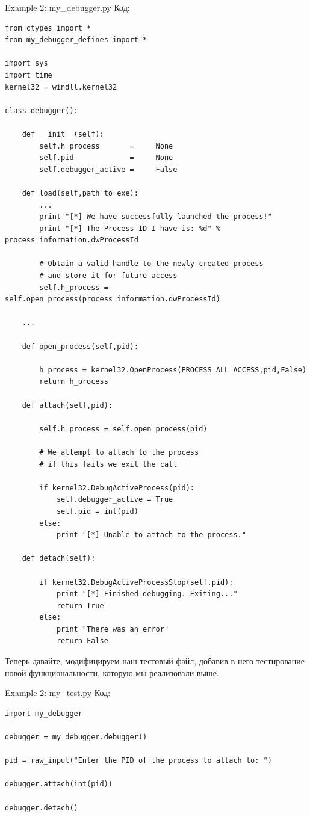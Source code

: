 \documentclass[12pt]{book}
\begin{document}
Example 2: my\_debugger.py
Код:
\begin{lstlisting}
from ctypes import *
from my_debugger_defines import *

import sys
import time
kernel32 = windll.kernel32

class debugger():

    def __init__(self):
        self.h_process       =     None
        self.pid             =     None
        self.debugger_active =     False
                                
    def load(self,path_to_exe):
        ...
        print "[*] We have successfully launched the process!"
        print "[*] The Process ID I have is: %d" % process_information.dwProcessId
        
        # Obtain a valid handle to the newly created process
        # and store it for future access
        self.h_process = self.open_process(process_information.dwProcessId)

    ...

    def open_process(self,pid):

        h_process = kernel32.OpenProcess(PROCESS_ALL_ACCESS,pid,False)
        return h_process

    def attach(self,pid):

        self.h_process = self.open_process(pid)

        # We attempt to attach to the process
        # if this fails we exit the call

        if kernel32.DebugActiveProcess(pid):
            self.debugger_active = True
            self.pid = int(pid)
        else:
            print "[*] Unable to attach to the process."

    def detach(self):

        if kernel32.DebugActiveProcessStop(self.pid):
            print "[*] Finished debugging. Exiting..."
            return True
        else:
            print "There was an error"
            return False
\end{lstlisting}

Теперь давайте, модифицируем наш тестовый файл, добавив в него тестирование новой функциональности, которую мы реализовали выше. 

Example 2: my\_test.py
Код:
\begin{lstlisting}
import my_debugger

debugger = my_debugger.debugger()

pid = raw_input("Enter the PID of the process to attach to: ")

debugger.attach(int(pid))

debugger.detach()
\end{lstlisting}
\end{document}
